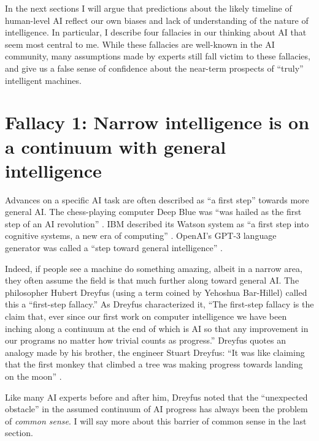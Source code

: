 \documentclass{article}
\begin{document}
In the next sections I will argue that predictions about the likely timeline of human-level AI reflect our own biases and lack of understanding of the nature of intelligence.  In particular, I describe four fallacies in our thinking about AI that seem most central to me. While these fallacies are well-known in the AI community, many assumptions made by experts still fall victim to these fallacies, and give us a false sense of confidence about the near-term prospects of ``truly'' intelligent machines.

\section*{Fallacy 1: Narrow intelligence is on a continuum with general intelligence}
Advances on a specific AI task are often described as ``a first step'' towards more general AI.  The chess-playing computer Deep Blue was ``was hailed as the first step of an AI revolution'' \cite{NewScientist2016}. IBM described its Watson system as ``a first step into cognitive systems, a new era of computing'' \cite{IBM2013}.  OpenAI's GPT-3 language generator was called a ``step toward general intelligence'' \cite{SSC2019}. 

Indeed, if people see a machine do something amazing, albeit in a narrow area, they often assume the field is that much further along toward general AI.  The philosopher Hubert Dreyfus (using a term coined by Yehoshua Bar-Hillel) called this a ``first-step fallacy.'' As Dreyfus characterized it, ``The first-step fallacy is the claim that, ever since our first work on computer intelligence we have been inching along a continuum at the end of which is AI so that any improvement in our programs no matter how trivial counts as progress.''   Dreyfus quotes an analogy made by his brother, the engineer Stuart Dreyfus: ``It was like claiming that the first monkey that climbed a tree was making progress towards landing on the moon'' \cite{Dreyfus2012}.

Like many AI experts before and after him, Dreyfus noted that the ``unexpected obstacle'' in the assumed continuum of AI progress has always been the problem of \textit{common sense}.  I will say more about this barrier of common sense in the last section.  
\end{document}
